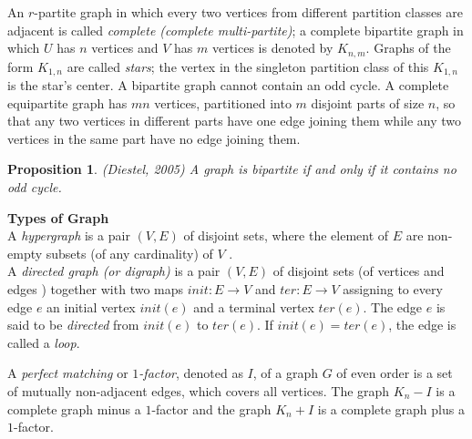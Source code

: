\documentclass[12pt]{report}
\newtheorem{prop}[thm]{Proposition}
\begin{document}
An $r$-partite graph in which every two vertices from different
partition classes are adjacent is called {\em complete (complete
multi-partite)}; a complete bipartite graph in which $U$ has $n$
vertices and $V$ has $m$ vertices is denoted by $K_{n,m}$. Graphs of
the form $K_{1,n}$ are called {\em stars}; the vertex in the
singleton partition class of this $K_{1,n}$ is the star's center. A
bipartite graph cannot contain an odd cycle. A complete equipartite
graph has $mn$ vertices, partitioned into $m$ disjoint parts of size
$n$, so that any two vertices in different parts have one edge
joining them while any two vertices in the same part have no edge
joining them.
\begin{prop}(Diestel, 2005)
A graph is bipartite if and only if it contains no odd cycle.
\end{prop}
{\bf Types of Graph}\\ A {\em hypergraph} is a pair $(V,E)$ of disjoint sets, where the element of $E$ are non-empty subsets (of any cardinality) of $V$ .\\
A {\em directed graph (or digraph)} is a pair $(V,E)$ of disjoint
sets (of vertices and edges ) together with two maps
$init:E\rightarrow V$ and $ter:E\rightarrow V$ assigning to every
edge $e$ an initial vertex $init(e)$ and a terminal vertex $ter(e)$.
The edge $e$ is said to be {\em directed} from $init(e)$ to
$ter(e)$. If $init(e)=ter(e)$, the edge is called a {\em loop}.

A {\em perfect matching} or {\em $1$-factor}, denoted as $I$, of a
graph $G$ of even order is a set of mutually non-adjacent edges,
which covers all vertices. The graph $K_n-I$ is a complete graph
minus a $1$-factor and the graph $K_n+I$ is a complete graph plus a
$1$-factor.
\end{document}
